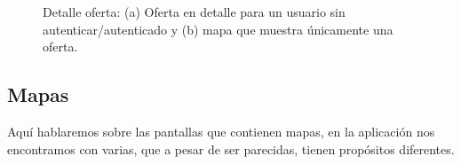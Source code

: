 \begin{figure}[tbp]
\caption{Detalle oferta: (a) Oferta en detalle para un usuario sin autenticar/autenticado y (b) mapa que muestra únicamente una oferta.}
\end{figure}

\subsection{Mapas}
Aquí hablaremos sobre las pantallas que contienen mapas, en la aplicación nos encontramos con varias, que a pesar de ser parecidas, tienen propósitos diferentes.

